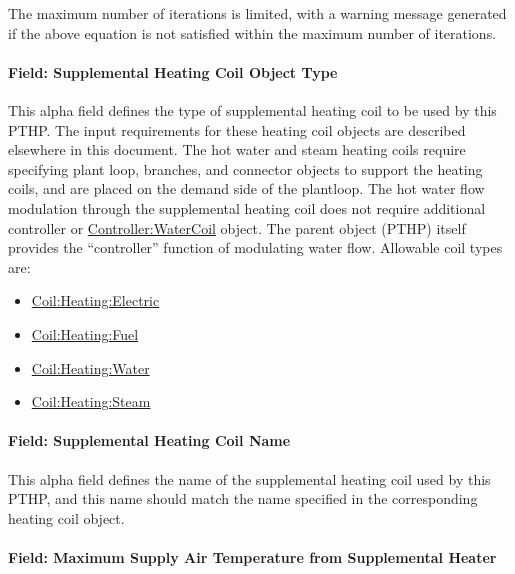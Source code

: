 The maximum number of iterations is limited, with a warning message generated if the above equation is not satisfied within the maximum number of iterations.

\paragraph{Field: Supplemental Heating Coil Object Type}\label{field-supplemental-heating-coil-object-type-000}

This alpha field defines the type of supplemental heating coil to be used by this PTHP. The input requirements for these heating coil objects are described elsewhere in this document. The hot water and steam heating coils require specifying plant loop, branches, and connector objects to support the heating coils, and are placed on the demand side of the plantloop. The hot water flow modulation through the supplemental heating coil does not require additional controller or \hyperref[controllerwatercoil]{Controller:WaterCoil} object. The parent object (PTHP) itself provides the ``controller'' function of modulating water flow. Allowable coil types are:

\begin{itemize}
\item
  \hyperref[coilheatingelectric]{Coil:Heating:Electric}
\item
  \hyperref[coilheatinggas-000]{Coil:Heating:Fuel}
\item
  \hyperref[coilheatingwater]{Coil:Heating:Water}
\item
  \hyperref[coilheatingsteam]{Coil:Heating:Steam}
\end{itemize}

\paragraph{Field: Supplemental Heating Coil Name}\label{field-supplemental-heating-coil-name-000}

This alpha field defines the name of the supplemental heating coil used by this PTHP, and this name should match the name specified in the corresponding heating coil object.

\paragraph{Field: Maximum Supply Air Temperature from Supplemental Heater}\label{field-maximum-supply-air-temperature-from-supplemental-heater-000}

